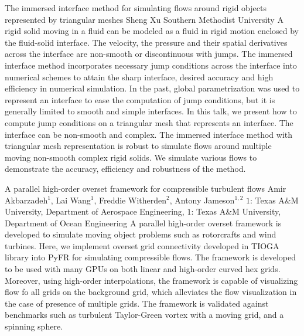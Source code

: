 \begin{addmargin}[2em]{0em}
\vspace{1.5ex}
\abs
{The immersed interface method for simulating flows around rigid objects represented by triangular meshes}
{Sheng Xu}
{Southern Methodist University}
{A rigid solid moving in a fluid can be modeled as a fluid in rigid motion enclosed by the fluid-solid interface.  The velocity, the pressure and their spatial derivatives across the interface are non-smooth or discontinuous with jumps. The immersed interface method incorporates necessary jump conditions across the interface into numerical schemes to attain the sharp interface, desired accuracy and high efficiency in numerical simulation. In the past, global parametrization was used to represent an interface to ease the computation of jump conditions, but it is generally limited to smooth and simple interfaces. In this talk, we present how to compute jump conditions on a triangular mesh that represents an interface. The interface can be non-smooth and complex. The immersed interface method with triangular mesh representation is robust to simulate flows around multiple moving non-smooth complex rigid solids. We simulate various flows to demonstrate the accuracy, efficiency and robustness of the method.}


\vspace{1.5ex}
\abs
{A parallel high-order overset framework for compressible turbulent flows}
{Amir Akbarzadeh$^1$, Lai Wang$^1$, Freddie Witherden$^2$, Antony Jameson$^{1,2}$}
{$1$: Texas A\&M University, Department of Aerospace Engineering, $1$: Texas A\&M University, Department of Ocean Engineering}
{A parallel high-order overset framework is developed to simulate moving object problems such as rotorcrafts and wind turbines. Here, we implement overset grid connectivity developed in TIOGA library into PyFR for simulating compressible flows. The framework is developed to be used with many GPUs on both linear and high-order curved hex grids. Moreover, using high-order interpolations, the framework is capable of visualizing flow fo all grids on the background grid, which alleviates the flow visualization in the case of presence of multiple grids. The framework is validated against benchmarks such as turbulent Taylor-Green vortex with a moving grid, and a spinning sphere.}



\end{addmargin}

